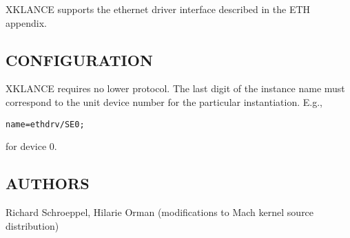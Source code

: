 XKLANCE supports the ethernet driver interface
described in the ETH appendix.


\subsection*{CONFIGURATION}

XKLANCE requires no lower protocol.  The last digit of the instance
name must correspond to the unit device number for the particular
instantiation.  E.g., 

\medskip

{\tt name=ethdrv/SE0;}

\medskip

\noindent for device 0.


\subsection*{AUTHORS}

\noindent Richard Schroeppel, Hilarie Orman (modifications to Mach
kernel source distribution)

